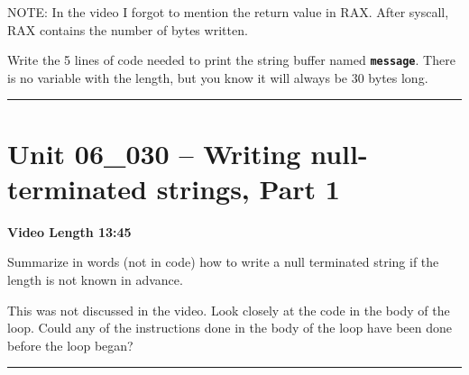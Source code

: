 \documentclass[letterpaper,12pt]{exam}
\newcommand{\unit}{Unit 06}
\begin{document}
\begin{questions}
NOTE:  In the video I forgot to mention the return value in RAX.  After syscall, RAX contains the number of bytes written.
\begin{samepage}
    \question Write the 5 lines of code needed to print the string buffer named \textbf{\texttt{message}}.  There is no variable with the length, but you know it will always be 30 bytes long.
    \vspace{55mm}
\end{samepage}
\par
\rule{0.5\textwidth}{.4pt} %
\section*{\unit\_030 -- Writing null-terminated strings, Part 1}
\par{\selectfont\textbf{Video Length 13:45}}
\begin{samepage}
    \question Summarize in words (not in code) how to write a null terminated string if the length is not known in advance.
    \vspace{45mm}
\end{samepage}
\par
\begin{samepage}
    \question This was not discussed in the video.  Look closely at the code in the body of the loop.  Could any of the instructions done in the body of the loop have been done before the loop began?
    \vspace{5mm}
\end{samepage}
\par
 
\rule{0.5\textwidth}{.4pt} %

\end{questions}
\end{document}

